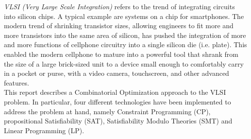 \textit{VLSI (Very Large Scale Integration)} refers to the trend of integrating circuits into 
silicon chips. A typical example are systems on a chip for smartphones. The modern trend of shrinking transistor sizes,
allowing engineers to fit more and more transistors into the same area of silicon, has pushed the 
integration of more and more functions of cellphone circuitry into a single silicon die (i.e. 
plate). This enabled the modern cellphone to mature into a powerful tool that shrank from the size 
of a large brick-sized unit to a device small enough to comfortably carry in a pocket or purse, 
with a video camera, touchscreen, and other advanced features. \\

This report describes a Combinatorial Optimization approach to the VLSI problem. In particular, 
four different technologies have been implemented to address the problem at hand, namely Constraint 
Programming (CP), propositional Satisfiability (SAT), Satisfiability Modulo Theories (SMT) and 
Linear Programming (LP).